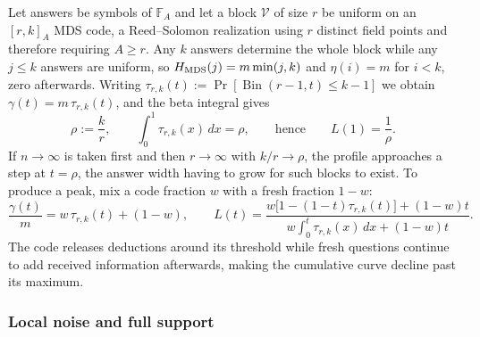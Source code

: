 Let answers be symbols of $\mathbb F_{A}$ and let a block
$\mathcal V$ of size $r$ be uniform on an $[r,k]_{A}$ MDS code, a
Reed--Solomon realization using $r$ distinct field points and
therefore requiring $A \ge r$. Any $k$ answers determine the whole
block while any $j \le k$ answers are uniform, so
$H_{\rm MDS}(j) = m\min(j,k)$ and $\eta(i) = m$ for $i < k$, zero
afterwards. Writing
$\tau_{r,k}(t) := \Pr[\operatorname{Bin}(r-1,t)\le k-1]$ we obtain
$\gamma(t) = m\,\tau_{r,k}(t)$, and the beta integral gives
%
\begin{equation}
  \rho := \frac kr,
  \qquad
  \int_0^1\tau_{r,k}(x)\,dx = \rho,
  \qquad\text{hence}\qquad
  L(1) = \frac1\rho .
  \label{eq:mdsrate}
\end{equation}
%
If $n\to\infty$ is taken first and then $r\to\infty$ with
$k/r\to\rho$, the profile approaches a step at $t = \rho$, the answer
width having to grow for such blocks to exist. To produce a peak, mix
a code fraction $w$ with a fresh fraction $1-w$:
%
\begin{equation}
  \frac{\gamma(t)}m = w\,\tau_{r,k}(t) + (1-w),
  \qquad
  L(t) = \frac{w\big[1-(1-t)\tau_{r,k}(t)\big] + (1-w)t}
    {w\int_0^t\tau_{r,k}(x)\,dx + (1-w)t} . 
  \label{eq:mdsfresh}
\end{equation}
%
The code releases deductions around its threshold while fresh
questions continue to add received information afterwards, making the
cumulative curve decline past its maximum.

\subsubsection{Local noise and full support}

